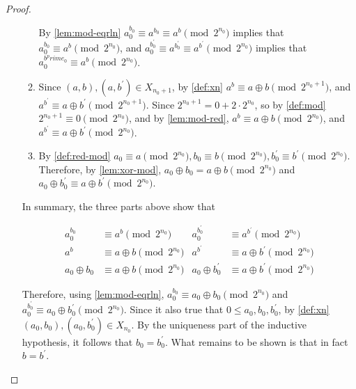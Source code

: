 \documentclass[1gpt]{article}
\theoremstyle{break}
\newcommand{\xor}{\oplus}
\begin{document}
\begin{proof}
\begin{enumerate}
\begin{enumerate}
                    By \ref{lem:mod-eqrln} $a_0^{b_0} \equiv a^{b_0} \equiv a^b
                    \pmod{2^{n_0}}$ implies that $a_0^{b_0} \equiv a^b
                    \pmod{2^{n_0}}$, and $a_0^{b^\prime_0} \equiv
                    a^{b^\prime_0} \equiv a^{b^\prime} \pmod{2^{n_0}}$ implies
                    that $a_0^{b^prime_0} \equiv a^b \pmod{2^{n_0}}$.

                \item
                    Since $(a, b), (a, b^\prime) \in X_{n_0+1}$, by
                    \ref{def:xn} $a^b \equiv a \xor b \pmod{2^{n_0+1}}$, and
                    $a^{b^\prime} \equiv a \xor b^\prime \pmod{2^{n_0+1}}$.
                    Since $2^{n_0+1} = 0 + 2 \cdot 2^{n_0}$, so by
                    \ref{def:mod} $2^{n_0+1} \equiv 0 \pmod{2^{n_0}}$, and by
                    \ref{lem:mod-red}, $a^b \equiv a \xor b \pmod{2^{n_0}}$,
                    and $a^{b^\prime} \equiv a \xor b^\prime \pmod{2^{n_0}}$.

                \item

                    By \ref{def:red-mod} $a_0 \equiv a \pmod{2^{n_0}}, b_0
                    \equiv b \pmod{2^{n_0}}, b^\prime_0 \equiv b^\prime
                    \pmod{2^{n_0}}$. Therefore, by \ref{lem:xor-mod}, $a_0 \xor
                    b_0 = a \xor b \pmod{2^{n_0}}$ and $a_0 \xor b^\prime_0
                    \equiv a \xor b^\prime \pmod{2^{n_0}}$.
                    
            \end{enumerate}

            In summary, the three parts above show that

            \begin{align*}
                a_0^{b_0} &\equiv a^b \pmod{2^{n_0}} & a_0^{b^\prime_0} &\equiv a^{b^\prime} \pmod{2^{n_0}} \\
                a^b &\equiv a \xor b \pmod{2^{n_0}} & a^{b^\prime} &\equiv a \xor b^\prime \pmod{2^{n_0}} \\
                a_0 \xor b_0 &\equiv a \xor b \pmod{2^{n_0}} & a_0 \xor b^\prime_0 &\equiv a \xor b^\prime \pmod{2^{n_0}}
            \end{align*}

            Therefore, using \ref{lem:mod-eqrln}, $a_0^{b_0} \equiv a_0 \xor
            b_0 \pmod{2^{n_0}}$ and $a_0^{b^\prime_0} \equiv a_0 \xor
            b^\prime_0 \pmod{2^{n_0}}$. Since it also true that $0 \leq a_0,
            b_0, b^\prime_0$, by \ref{def:xn} $(a_0, b_0), (a_0, b^\prime_0)
            \in X_{n_0}$. By the uniqueness part of the inductive hypothesis,
            it follows that $b_0 = b^\prime_0$. What remains to be shown is that
            in fact $b = b^\prime$.


\end{enumerate}
\end{proof}
\end{document}
